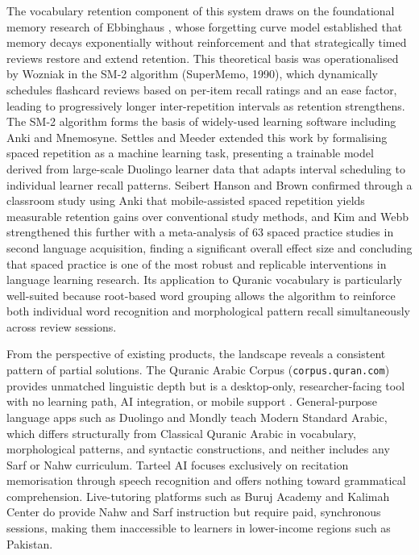 \documentclass[A4paper,12pt]{article}
\begin{document}
The vocabulary retention component of this system draws on the foundational memory research of
Ebbinghaus \cite{ebbinghaus1885}, whose forgetting curve model established that memory decays
exponentially without reinforcement and that strategically timed reviews restore and extend
retention. This theoretical basis was operationalised by Wozniak in the SM-2 algorithm
(SuperMemo, 1990), which dynamically schedules flashcard reviews based on per-item recall
ratings and an ease factor, leading to progressively longer inter-repetition intervals as
retention strengthens. The SM-2 algorithm forms the basis of widely-used learning software
including Anki and Mnemosyne. Settles and Meeder \cite{settles2016} extended this work by
formalising spaced repetition as a machine learning task, presenting a trainable model derived
from large-scale Duolingo learner data that adapts interval scheduling to individual learner
recall patterns. Seibert Hanson and Brown \cite{seibert2020} confirmed through a classroom
study using Anki that mobile-assisted spaced repetition yields measurable retention gains over
conventional study methods, and Kim and Webb \cite{kim2022} strengthened this further with a
meta-analysis of 63 spaced practice studies in second language acquisition, finding a significant
overall effect size and concluding that spaced practice is one of the most robust and replicable
interventions in language learning research. Its application to Quranic vocabulary is particularly
well-suited because root-based word grouping allows the algorithm to reinforce both individual
word recognition and morphological pattern recall simultaneously across review sessions.

From the perspective of existing products, the landscape reveals a consistent pattern of partial
solutions. The Quranic Arabic Corpus (\texttt{corpus.quran.com}) provides unmatched linguistic
depth but is a desktop-only, researcher-facing tool with no learning path, AI integration, or
mobile support \cite{dukes2010}. General-purpose language apps such as Duolingo and Mondly teach
Modern Standard Arabic, which differs structurally from Classical Quranic Arabic in vocabulary,
morphological patterns, and syntactic constructions, and neither includes any Sarf or Nahw
curriculum. Tarteel AI \cite{tarteel2024} focuses exclusively on recitation memorisation through
speech recognition and offers nothing toward grammatical comprehension. Live-tutoring platforms
such as Buruj Academy and Kalimah Center do provide Nahw and Sarf instruction but require paid,
synchronous sessions, making them inaccessible to learners in lower-income regions such as
Pakistan.
\end{document}
